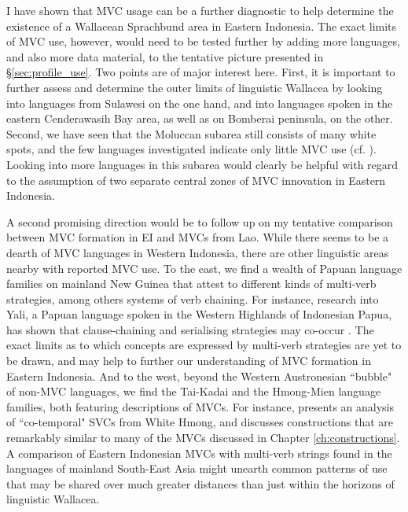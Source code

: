 I have shown that MVC usage can be a further diagnostic to help determine the existence of a Wallacean Sprachbund area in Eastern Indonesia. The exact limits of MVC use, however, would need to be tested further by adding more languages, and also more data material, to the tentative picture presented in §\ref{sec:profile_use}. Two points are of major interest here. First, it is important to further assess and determine the outer limits of linguistic Wallacea by looking into languages from Sulawesi on the one hand, and into languages spoken in the eastern Cenderawasih Bay area, as well as on Bomberai peninsula, on the other.  Second, we have seen that the Moluccan subarea still consists of many white spots, and the few languages investigated indicate only little MVC use (cf. ). Looking into more languages in this subarea would clearly be helpful with regard to the assumption of two separate central zones of MVC innovation in Eastern Indonesia.

A second promising direction would be to follow up on my tentative comparison between MVC formation in EI and MVCs from Lao. While there seems to be a dearth of MVC languages in Western Indonesia, there are other linguistic areas nearby with reported MVC use. To the east, we find a wealth of Papuan language families on mainland New Guinea that attest to different kinds of multi-verb strategies, among others systems of verb chaining. For instance, research into Yali, a Papuan language spoken in the Western Highlands of Indonesian Papua, has shown that clause-chaining and serialising strategies may co-occur \citep{riesberg2013}. The exact limits as to which concepts are expressed by multi-verb strategies are yet to be drawn, and may help to further our understanding of MVC formation in Eastern Indonesia. And to the west, beyond the Western Austronesian ``bubble" of non-MVC languages, we find the Tai-Kadai and the Hmong-Mien language families, both featuring descriptions of MVCs. For instance, \citet{jarkey2010cotemporal} presents an analysis of ``co-temporal" SVCs from White Hmong, and discusses constructions that are remarkably similar to many of the MVCs discussed in Chapter \ref{ch:constructions}. A comparison of Eastern Indonesian MVCs with multi-verb strings found in the languages of mainland South-East Asia might unearth common patterns of use that may be shared over much greater distances than just within the horizons of linguistic Wallacea.


